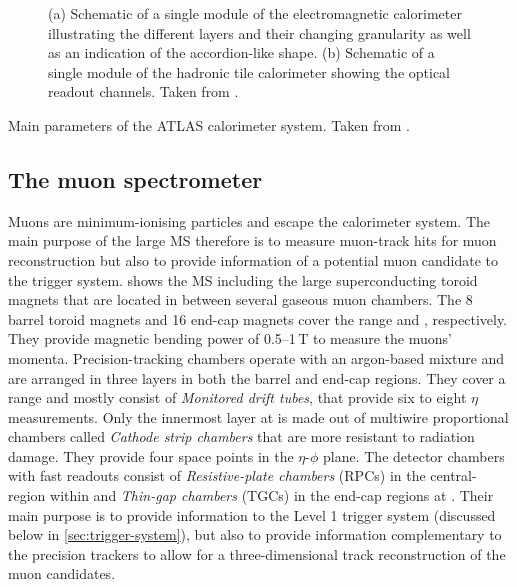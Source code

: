 \begin{figure}
    \caption[Schematics of single modules of the ATLAS calorimeters.]{(a) Schematic of a single module of the electromagnetic calorimeter illustrating the different layers and their changing granularity as well as an indication of the accordion-like shape. (b) Schematic of a single module of the hadronic tile calorimeter showing the optical readout channels. Taken from .}
    \label{fig:ATLASmodules}
\end{figure}

\begin{table}
    \caption[Main parameters of the ATLAS calorimeter system.]{Main parameters of the ATLAS calorimeter system. Taken from .}
    \label{tab:ATLAScalorimeter-parameters}
\end{table}



\subsection{The muon spectrometer}
Muons are minimum-ionising particles and escape the calorimeter system.
The main purpose of the large MS therefore is to measure muon-track hits for muon reconstruction but also to provide information of a potential muon candidate to the trigger system.
 shows the MS including the large superconducting toroid magnets that are located in between several gaseous muon chambers.
The 8 barrel toroid magnets and 16 end-cap magnets cover the range  and , respectively. They provide magnetic bending power of \numrange{0.5}{1}\,T to measure the muons' momenta. Precision-tracking chambers operate with an argon-based mixture and are arranged in three layers in both the barrel and end-cap regions. They cover a range  and mostly consist of \emph{Monitored drift tubes}, that provide six to eight $\eta$ measurements. Only the innermost layer at  is made out of multiwire proportional chambers called \emph{Cathode strip chambers} that are more resistant to radiation damage. They provide four space points in the $\eta$-$\phi$ plane. The detector chambers with fast readouts consist of \emph{Resistive-plate chambers} (RPCs) in the central-region within  and \emph{Thin-gap chambers} (TGCs) in the end-cap regions at .
Their main purpose is to provide information to the Level 1 trigger system (discussed below in \cref{sec:trigger-system}), but also to provide information complementary to the precision trackers to allow for a three-dimensional track reconstruction of the muon candidates.

